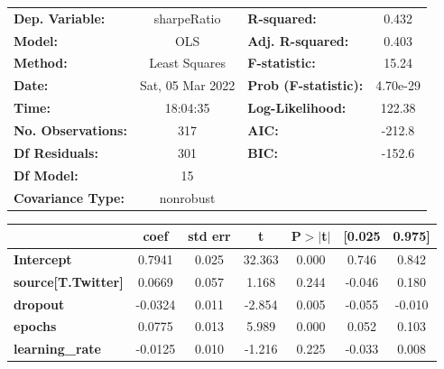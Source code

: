 \begin{center}
\begin{tabular}{lclc}
\toprule
\textbf{Dep. Variable:}              &   sharpeRatio    & \textbf{  R-squared:         } &     0.432   \\
\textbf{Model:}                      &       OLS        & \textbf{  Adj. R-squared:    } &     0.403   \\
\textbf{Method:}                     &  Least Squares   & \textbf{  F-statistic:       } &     15.24   \\
\textbf{Date:}                       & Sat, 05 Mar 2022 & \textbf{  Prob (F-statistic):} &  4.70e-29   \\
\textbf{Time:}                       &     18:04:35     & \textbf{  Log-Likelihood:    } &    122.38   \\
\textbf{No. Observations:}           &         317      & \textbf{  AIC:               } &    -212.8   \\
\textbf{Df Residuals:}               &         301      & \textbf{  BIC:               } &    -152.6   \\
\textbf{Df Model:}                   &          15      & \textbf{                     } &             \\
\textbf{Covariance Type:}            &    nonrobust     & \textbf{                     } &             \\
\bottomrule
\end{tabular}
\begin{tabular}{lcccccc}
                                     & \textbf{coef} & \textbf{std err} & \textbf{t} & \textbf{P$> |$t$|$} & \textbf{[0.025} & \textbf{0.975]}  \\
\midrule
\textbf{Intercept}                   &       0.7941  &        0.025     &    32.363  &         0.000        &        0.746    &        0.842     \\
\textbf{source[T.Twitter]}           &       0.0669  &        0.057     &     1.168  &         0.244        &       -0.046    &        0.180     \\
\textbf{dropout}                     &      -0.0324  &        0.011     &    -2.854  &         0.005        &       -0.055    &       -0.010     \\
\textbf{epochs}                      &       0.0775  &        0.013     &     5.989  &         0.000        &        0.052    &        0.103     \\
\textbf{learning\_rate}              &      -0.0125  &        0.010     &    -1.216  &         0.225        &       -0.033    &        0.008     \\

\end{tabular}
\end{center}
